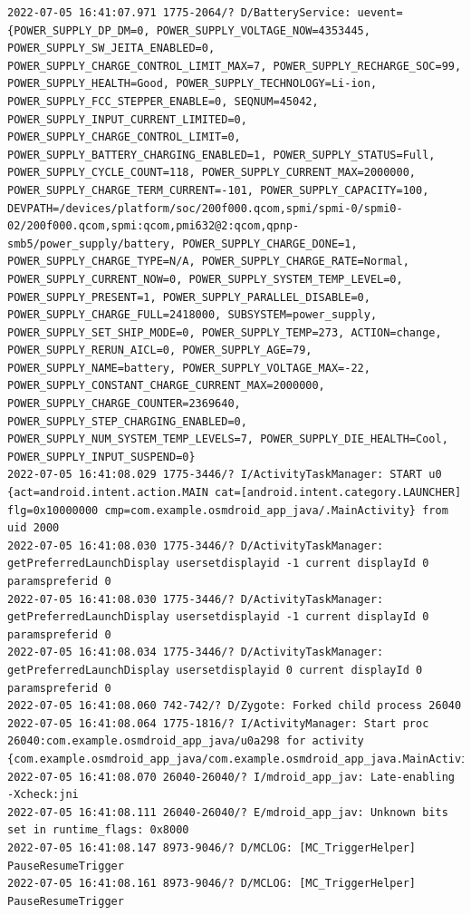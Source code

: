 \documentclass[a4paper,12pt]{book}
\begin{document}
\begin{lstlisting}
2022-07-05 16:41:07.971 1775-2064/? D/BatteryService: uevent={POWER_SUPPLY_DP_DM=0, POWER_SUPPLY_VOLTAGE_NOW=4353445, POWER_SUPPLY_SW_JEITA_ENABLED=0, POWER_SUPPLY_CHARGE_CONTROL_LIMIT_MAX=7, POWER_SUPPLY_RECHARGE_SOC=99, POWER_SUPPLY_HEALTH=Good, POWER_SUPPLY_TECHNOLOGY=Li-ion, POWER_SUPPLY_FCC_STEPPER_ENABLE=0, SEQNUM=45042, POWER_SUPPLY_INPUT_CURRENT_LIMITED=0, POWER_SUPPLY_CHARGE_CONTROL_LIMIT=0, POWER_SUPPLY_BATTERY_CHARGING_ENABLED=1, POWER_SUPPLY_STATUS=Full, POWER_SUPPLY_CYCLE_COUNT=118, POWER_SUPPLY_CURRENT_MAX=2000000, POWER_SUPPLY_CHARGE_TERM_CURRENT=-101, POWER_SUPPLY_CAPACITY=100, DEVPATH=/devices/platform/soc/200f000.qcom,spmi/spmi-0/spmi0-02/200f000.qcom,spmi:qcom,pmi632@2:qcom,qpnp-smb5/power_supply/battery, POWER_SUPPLY_CHARGE_DONE=1, POWER_SUPPLY_CHARGE_TYPE=N/A, POWER_SUPPLY_CHARGE_RATE=Normal, POWER_SUPPLY_CURRENT_NOW=0, POWER_SUPPLY_SYSTEM_TEMP_LEVEL=0, POWER_SUPPLY_PRESENT=1, POWER_SUPPLY_PARALLEL_DISABLE=0, POWER_SUPPLY_CHARGE_FULL=2418000, SUBSYSTEM=power_supply, POWER_SUPPLY_SET_SHIP_MODE=0, POWER_SUPPLY_TEMP=273, ACTION=change, POWER_SUPPLY_RERUN_AICL=0, POWER_SUPPLY_AGE=79, POWER_SUPPLY_NAME=battery, POWER_SUPPLY_VOLTAGE_MAX=-22, POWER_SUPPLY_CONSTANT_CHARGE_CURRENT_MAX=2000000, POWER_SUPPLY_CHARGE_COUNTER=2369640, POWER_SUPPLY_STEP_CHARGING_ENABLED=0, POWER_SUPPLY_NUM_SYSTEM_TEMP_LEVELS=7, POWER_SUPPLY_DIE_HEALTH=Cool, POWER_SUPPLY_INPUT_SUSPEND=0}
2022-07-05 16:41:08.029 1775-3446/? I/ActivityTaskManager: START u0 {act=android.intent.action.MAIN cat=[android.intent.category.LAUNCHER] flg=0x10000000 cmp=com.example.osmdroid_app_java/.MainActivity} from uid 2000
2022-07-05 16:41:08.030 1775-3446/? D/ActivityTaskManager: getPreferredLaunchDisplay usersetdisplayid -1 current displayId 0 paramspreferid 0
2022-07-05 16:41:08.030 1775-3446/? D/ActivityTaskManager: getPreferredLaunchDisplay usersetdisplayid -1 current displayId 0 paramspreferid 0
2022-07-05 16:41:08.034 1775-3446/? D/ActivityTaskManager: getPreferredLaunchDisplay usersetdisplayid 0 current displayId 0 paramspreferid 0
2022-07-05 16:41:08.060 742-742/? D/Zygote: Forked child process 26040
2022-07-05 16:41:08.064 1775-1816/? I/ActivityManager: Start proc 26040:com.example.osmdroid_app_java/u0a298 for activity {com.example.osmdroid_app_java/com.example.osmdroid_app_java.MainActivity}
2022-07-05 16:41:08.070 26040-26040/? I/mdroid_app_jav: Late-enabling -Xcheck:jni
2022-07-05 16:41:08.111 26040-26040/? E/mdroid_app_jav: Unknown bits set in runtime_flags: 0x8000
2022-07-05 16:41:08.147 8973-9046/? D/MCLOG: [MC_TriggerHelper] PauseResumeTrigger
2022-07-05 16:41:08.161 8973-9046/? D/MCLOG: [MC_TriggerHelper] PauseResumeTrigger

\end{lstlisting}
\end{document}
